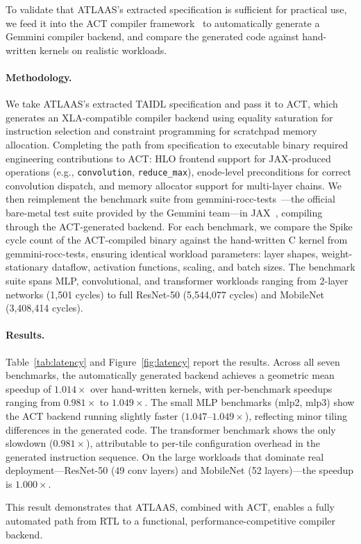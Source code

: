 To validate that ATLAAS's extracted specification is sufficient for practical use, we feed it into the ACT compiler framework~\cite{act-arxiv} to automatically generate a Gemmini compiler backend, and compare the generated code against hand-written kernels on realistic workloads.

\paragraph{Methodology.}
We take ATLAAS's extracted TAIDL specification and pass it to ACT, which generates an XLA-compatible compiler backend using equality saturation for instruction selection and constraint programming for scratchpad memory allocation.
Completing the path from specification to executable binary required engineering contributions to ACT: HLO frontend support for JAX-produced operations (e.g., \texttt{convolution}, \texttt{reduce\_max}), enode-level preconditions for correct convolution dispatch, and memory allocator support for multi-layer chains.
We then reimplement the benchmark suite from gemmini-rocc-tests~\cite{gemmini-rocc-tests}---the official bare-metal test suite provided by the Gemmini team---in JAX~\cite{jax2018github}, compiling through the ACT-generated backend.
For each benchmark, we compare the Spike cycle count of the ACT-compiled binary against the hand-written C kernel from gemmini-rocc-tests, ensuring identical workload parameters: layer shapes, weight-stationary dataflow, activation functions, scaling, and batch sizes.
The benchmark suite spans MLP, convolutional, and transformer workloads ranging from 2-layer networks (1{,}501 cycles) to full ResNet-50 (5{,}544{,}077 cycles) and MobileNet (3{,}408{,}414 cycles).

\paragraph{Results.}
Table~\ref{tab:latency} and Figure~\ref{fig:latency} report the results.
Across all seven benchmarks, the automatically generated backend achieves a geometric mean speedup of $1.014\times$ over hand-written kernels, with per-benchmark speedups ranging from $0.981\times$ to $1.049\times$.
The small MLP benchmarks (mlp2, mlp3) show the ACT backend running slightly faster ($1.047$--$1.049\times$), reflecting minor tiling differences in the generated code.
The transformer benchmark shows the only slowdown ($0.981\times$), attributable to per-tile configuration overhead in the generated instruction sequence.
On the large workloads that dominate real deployment---ResNet-50 (49 conv layers) and MobileNet (52 layers)---the speedup is $1.000\times$.

This result demonstrates that ATLAAS, combined with ACT, enables a fully automated path from RTL to a functional, performance-competitive compiler backend.
